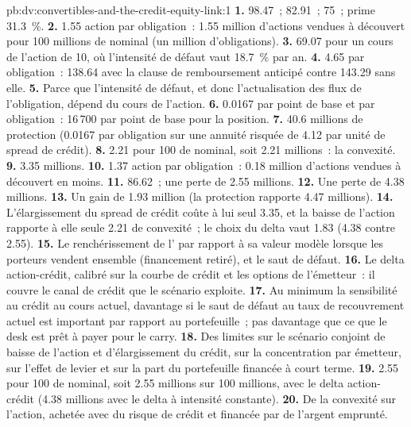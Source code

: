 \begin{solution}{pb:dv:convertibles-and-the-credit-equity-link:1}
\textbf{1.} 98.47~;  82.91~;  75~; prime 31.3~\%.
\textbf{2.} 1.55 action par obligation~: 1.55 million d'actions vendues à découvert pour 100 millions de nominal (un million d'obligations).
\textbf{3.} 69.07 pour un cours de l'action de 10, où l'intensité de défaut vaut 18.7~\% par an.
\textbf{4.} 4.65 par obligation~: 138.64 avec la clause de remboursement anticipé contre 143.29 sans elle.
\textbf{5.} Parce que l'intensité de défaut, et donc l'actualisation des flux de l'obligation, dépend du cours de l'action.
\textbf{6.} 0.0167 par point de base et par obligation~: 16\,700 par point de base pour la position.
\textbf{7.} 40.6 millions de protection (0.0167 par obligation sur une annuité risquée de 4.12 par unité de spread de crédit).
\textbf{8.} 2.21 pour 100 de nominal, soit 2.21 millions~: la convexité.
\textbf{9.} 3.35 millions.
\textbf{10.} 1.37 action par obligation~: 0.18 million d'actions vendues à découvert en moins.
\textbf{11.} 86.62~; une perte de 2.55 millions.
\textbf{12.} Une perte de 4.38 millions.
\textbf{13.} Un gain de 1.93 million (la protection rapporte 4.47 millions).
\textbf{14.} L'élargissement du spread de crédit coûte à lui seul 3.35, et la baisse de l'action rapporte à elle seule 2.21 de convexité~; le choix du delta vaut 1.83 (4.38 contre 2.55).
\textbf{15.} Le renchérissement de l' par rapport à sa valeur modèle lorsque les porteurs vendent ensemble (financement retiré), et le saut de défaut.
\textbf{16.} Le delta action-crédit, calibré sur la courbe de crédit et les options de l'émetteur~: il couvre le canal de crédit que le scénario exploite.
\textbf{17.} Au minimum la sensibilité au crédit au cours actuel, davantage si le saut de défaut au taux de recouvrement actuel est important par rapport au portefeuille~;
pas davantage que ce que le desk est prêt à payer pour le carry.
\textbf{18.} Des limites sur le scénario conjoint de baisse de l'action et d'élargissement du crédit, sur la concentration par émetteur, sur l'effet de levier et sur la part du portefeuille financée à court terme.
\textbf{19.} 2.55 pour 100 de nominal, soit 2.55 millions sur 100 millions, avec le delta action-crédit (4.38 millions avec le delta à intensité constante).
\textbf{20.} De la convexité sur l'action, achetée avec du risque de crédit et financée par de l'argent emprunté.
\end{solution}

